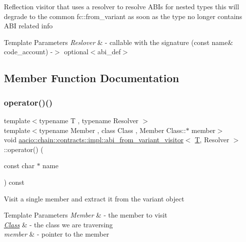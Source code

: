 Reflection visitor that uses a resolver to resolve A\+B\+Is for nested types this will degrade to the common fc\+::from\+\_\+variant as soon as the type no longer contains A\+BI related info


\begin{DoxyTemplParams}{Template Parameters}
{\em Reslover} & -\/ callable with the signature (const name\& code\+\_\+account) -\/$>$ optional$<$abi\+\_\+def$>$ \\
\hline
\end{DoxyTemplParams}


\subsection{Member Function Documentation}
\mbox{\label{classaacio_1_1chain_1_1contracts_1_1impl_1_1abi__from__variant__visitor_a84172f51e3037e20703f1d15a71c7263}} 
\subsubsection{\texorpdfstring{operator()()}{operator()()}}
{\footnotesize\ttfamily template$<$typename T , typename Resolver $>$ \\
template$<$typename Member , class Class , Member Class\+::$\ast$ member$>$ \\
void \mbox{\hyperlink{classaacio_1_1chain_1_1contracts_1_1impl_1_1abi__from__variant__visitor}{aacio\+::chain\+::contracts\+::impl\+::abi\+\_\+from\+\_\+variant\+\_\+visitor}}$<$ \mbox{\hyperlink{struct_t}{T}}, Resolver $>$\+::operator() (\begin{DoxyParamCaption}\item[{const char $\ast$}]{name }\end{DoxyParamCaption}) const\hspace{0.3cm}{\ttfamily [inline]}}

Visit a single member and extract it from the variant object 
\begin{DoxyTemplParams}{Template Parameters}
{\em Member} & -\/ the member to visit \\
\hline
{\em \mbox{\hyperlink{class_class}{Class}}} & -\/ the class we are traversing \\
\hline
{\em member} & -\/ pointer to the member \\
\hline
\end{DoxyTemplParams}

